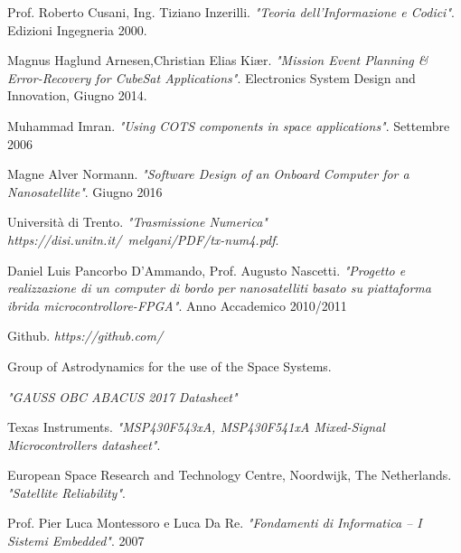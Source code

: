 \documentclass[LaM,binding=0.6cm,oneside]{../sapthesis}
\begin{document}
\begin{thebibliography}{9}
Prof. Roberto Cusani, Ing. Tiziano Inzerilli. 
\textit{"Teoria dell'Informazione e Codici"}. 
Edizioni Ingegneria 2000.

Magnus Haglund Arnesen,Christian Elias Kiær. 
\textit{"Mission Event Planning \& Error-Recovery for CubeSat Applications"}. 
Electronics System Design and Innovation, Giugno 2014.

Muhammad Imran.
\textit{"Using COTS components in space applications"}.
Settembre 2006

Magne Alver Normann.
\textit{"Software Design of an Onboard Computer
for a Nanosatellite"}. 
Giugno 2016

Università di Trento.
\textit{"Trasmissione Numerica" https://disi.unitn.it/~melgani/PDF/tx-num4.pdf}. 

Daniel Luis Pancorbo D'Ammando, Prof. Augusto Nascetti. 
\textit{"Progetto e realizzazione di un computer di bordo per nanosatelliti basato su piattaforma ibrida microcontrollore-FPGA"}.
Anno Accademico 2010/2011

Github. 
\textit{https://github.com/}


Group of Astrodynamics for the use of the Space Systems.

\textit{"GAUSS OBC ABACUS 2017 Datasheet"}

Texas Instruments. 
\textit{"MSP430F543xA, MSP430F541xA Mixed-Signal Microcontrollers datasheet"}.

European Space Research and Technology Centre, Noordwijk, The Netherlands.
\textit{"Satellite Reliability"}.

Prof. Pier Luca Montessoro e Luca Da Re.
\textit{"Fondamenti di Informatica – I Sistemi Embedded"}.
2007

\end{thebibliography}

\clearpage
\end{document}
